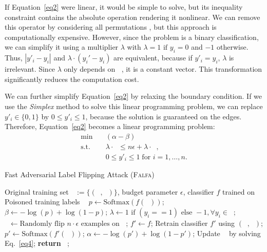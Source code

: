 \documentclass[runningheads]{llncs}
\newcommand{\falfa}{\textsc{Falfa}\xspace}
\DeclareMathOperator*{\Xtr}{\mathcal{X}_\text{train}}
\DeclareMathOperator*{\ytr}{\mathcal{Y}_\text{train}}
\DeclareMathOperator*{\ypo}{\mathcal{Y}^\prime_\text{train}}
\DeclareMathOperator*{\Dtr}{\mathcal{D}_\text{train}}
\begin{document}
If Equation~\ref{eq2} were linear, it would be simple to solve, but its inequality constraint contains the absolute operation rendering it nonlinear.
We can remove this operator by considering all permutations \cite{paudice2018label},
but this approach is computationally expensive.
However, since the problem is a binary classification, we can simplify it using a multiplier
$\lambda$ with $\lambda = 1 \text{ if } y_i = 0$ and $-1$ otherwise.
Thus, $|y'_i-y_i|$ and $\lambda \cdot (y_i' - y_i)$ are equivalent, because if $y'_i=y_i$,
$\lambda$ is irrelevant.
Since $\lambda$ only depends on $\ytr$, it is a constant vector.
This transformation significantly reduces the computation cost.

We can further simplify Equation~\ref{eq2} by relaxing the boundary condition.
If we use the {\em Simplex} method to solve this linear programming problem, we can replace $y'_i \in \{0, 1\}$ by $0 \leq y'_i \leq 1$, because the solution is guaranteed on the edges.
Therefore, Equation~\ref{eq2} becomes a linear programming problem:
\begin{equation}
    \begin{aligned}
        \min_{\ypo} \quad   & (\alpha - \beta)\ypo                                      \\
        \textrm{s.t.} \quad & \lambda \cdot \ypo \leq  n \epsilon + \lambda \cdot \ytr, \\
        \quad               & 0 \leq y'_i \leq 1  \; \text{for } i = 1,  \ldots, n.
    \end{aligned}
    \label{eq4}
\end{equation}

\begin{algorithm}[t!]
    \footnotesize
    \caption{Fast Adversarial Label Flipping Attack (\falfa)}
    \begin{algorithmic}[1]
        \Require
        Original training set $\Dtr:=\{(\Xtr, \ytr)\}$, budget parameter $\epsilon$, classifier $f$ trained on $\Dtr$
        \Ensure
        Poisoned training labels $\ypo$
        \State $p \gets \text{Softmax}(f(\Xtr))$;
        \State $\beta \gets -\log(p) + \log(1-p)$;
        \State $\lambda \gets 1 \text{ if } (y_i == 1) \text{ else } -1,  \forall y_i \in \ytr$;
        \State $\ypo \gets \text{Randomly flip } n \cdot \epsilon \text{ examples on } \ytr$;
        \State $f' \gets f$;
        \While{$\ypo$ does not converge}
        \State Retrain classifier $f'$ using $(\Xtr, \ypo)$;
        \State $p' \gets \text{Softmax}(f'(\Xtr))$;
        \State $\alpha \gets - \log(p') + \log(1-p')$;
        \State Update $\ypo$ by solving Eq.~\ref{eq4};
        \EndWhile
        \State \textbf{return} $\ypo$;
    \end{algorithmic}
    \label{alg.flfa}
\end{algorithm}
\end{document}
